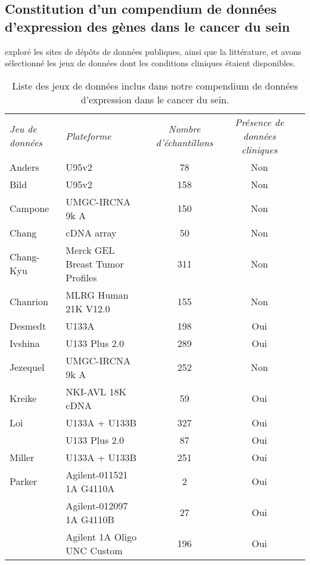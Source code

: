 		\subsection{\textcolor{mygreen}{Constitution d'un compendium de données d'expression des gènes dans le cancer du sein}}
			 exploré les sites de dépôts de données publiques, ainsi que la littérature, et avons sélectionné les jeux de données dont les conditions cliniques étaient disponibles.
			\begin{table}
				\begin{center}
					\caption{Liste des jeux de données inclus dans notre compendium de données d'expression dans le cancer du sein.}
					\begin{tabular}{llccc}
						\toprule
						\multirow{3}{3cm}{\emph{Jeu de données}} & \multirow{3}{2cm}{\emph{Plateforme}} & \multirow{3}{2cm}{\centering\emph{Nombre d'échantillons}} & \multirow{3}{2cm}{\centering\emph{Présence de données cliniques}} \\
										&									&		&		\\
										&									&		&		\\
						\midrule
						Anders			& U95v2								& 78	& Non	\\
						Bild			& U95v2								& 158	& Non	\\
						Campone			& UMGC-IRCNA 9k A					& 150	& Non	\\
						Chang			& cDNA array						& 50	& Non	\\
						Chang-Kyu		& Merck GEL Breast Tumor Profiles	& 311	& Non	\\
						Chanrion		& MLRG Human 21K V12.0				& 155	& Non	\\
						Desmedt			& U133A								& 198	& Oui	\\
						Ivshina			& U133 Plus 2.0						& 289	& Oui	\\
						Jezequel		& UMGC-IRCNA 9k A					& 252	& Non	\\
						Kreike			& NKI-AVL 18K cDNA					& 59	& Oui	\\
						Loi				& U133A + U133B						& 327	& Oui	\\
										& U133 Plus 2.0						& 87	& Oui	\\
						Miller			& U133A + U133B						& 251	& Oui	\\
						Parker			& Agilent-011521 1A G4110A			& 2		& Oui	\\
										& Agilent-012097 1A G4110B			& 27	& Oui	\\
										& Agilent 1A Oligo UNC Custom		& 196	& Oui	\\

\end{tabular}
\end{center}
\end{table}
